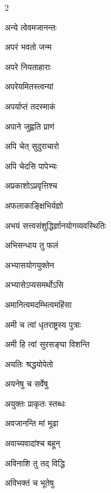 \begin{multicols}{2}
\begin{indexlist}
\item अन्ये त्वेवमजानन्तः \dotfill {}
\item अपरं भवतो जन्म \dotfill {}
\item अपरे नियताहाराः \dotfill {}
\item अपरेयमितस्त्वन्यां \dotfill {}
\item अपर्याप्तं तदस्माकं \dotfill {}
\item अपाने जुह्वति प्राणं \dotfill {}
\item अपि चेत् सुदुराचारो \dotfill {}
\item अपि चेदसि पापेभ्यः \dotfill {}
\item अप्रकाशोऽप्रवृत्तिश्च \dotfill {}
\item अफलाकाङ्क्षिभिर्यज्ञो \dotfill {}
\item अभयं सत्त्वसंशुद्धिर्ज्ञानयोगव्यवस्थितिः \dotfill {}
\item अभिसन्धाय तु फलं \dotfill {}
\item अभ्यासयोगयुक्तेन \dotfill {}
\item अभ्यासेऽप्यसमर्थोऽसि \dotfill {}
\item अमानित्वमदम्भित्वमहिंसा \dotfill {}
\item अमी च त्वां धृतराष्ट्रस्य पुत्राः \dotfill {}
\item अमी हि त्वां सुरसङ्घा विशन्ति \dotfill {}
\item अयतिः श्रद्धयोपेतो \dotfill {}
\item अयनेषु च सर्वेषु \dotfill {}
\item अयुक्तः प्राकृतः स्तब्धः \dotfill {}
\item अवजानन्ति मां मूढा \dotfill {}
\item अवाच्यवादांश्च बहून् \dotfill {}
\item अविनाशि तु तद् विद्धि \dotfill {}
\item अविभक्तं च भूतेषु \dotfill {}

\end{indexlist}
\end{multicols}
